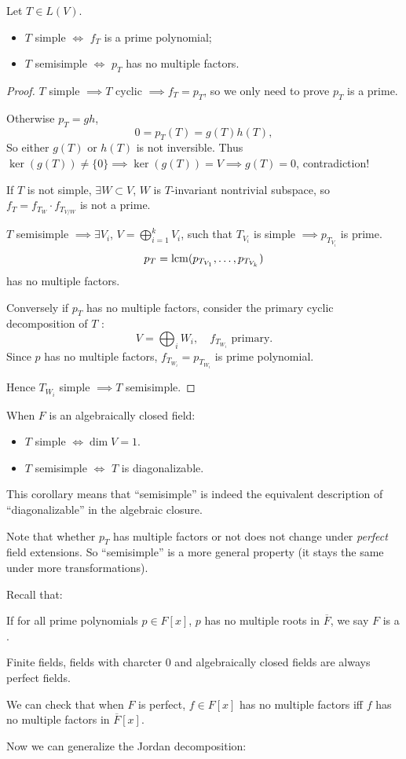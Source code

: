 \begin{theorem}
	Let $T\in L(V)$.
	\begin{itemize}
		\item $T$ simple $\iff$ $f_T$ is a prime polynomial;
		\item $T$ semisimple $\iff$ $p_T$ has no multiple factors.
	\end{itemize}
\end{theorem}
\begin{proof}[Proof]
    $T$ simple $ \implies T$ cyclic $ \implies f_T = p_T$,
	so we only need to prove $p_T$ is a prime.

	Otherwise $p_T = gh$,
	\[
	0 = p_T(T) = g(T) h(T),
	\]
	So either $g(T)$ or $h(T)$ is not inversible.
	Thus $\ker(g(T)) \ne \{0\}\implies \ker(g(T)) = V\implies g(T) = 0$,
	contradiction!

	If $T$ is not simple, $\exists W \subset V$, $W$ is $T$-invariant nontrivial
	subspace, so $f_T = f_{T_W} \cdot f_{T_{V / W}}$ is not a prime.

	\vspace{1em}
	$T$ semisimple $ \implies \exists V_i$, $V = \bigoplus_{i=1}^k V_i$,
	such that $T_{V_i}$ is simple $ \implies p_{T_{V_i}}$ is prime.
	\[
	p_T = \operatorname{lcm}(p_{T_{V_1}}, \dots, p_{T_{V_k}})
	\]
	has no multiple factors.

	Conversely if $p_T$ has no multiple factors, consider the primary cyclic
	decomposition of $T$ :
	\[
	V = \bigoplus_i W_i,\quad f_{T_{W_i}} \text{ primary.}
	\]
	Since $p$ has no multiple factors,
	$f_{T_{W_i}} = p_{T_{W_i}}$ is prime polynomial.

	Hence $T_{W_i}$ simple $ \implies T$ semisimple.
\end{proof}

\begin{corollary}
    When $F$ is an algebraically closed field:
	\begin{itemize}
		\item $T$ simple $\iff \dim V = 1$.
		\item $T$ semisimple $\iff$ $T$ is diagonalizable.
	\end{itemize}
\end{corollary}

This corollary means that ``semisimple'' is indeed the
equivalent description of ``diagonalizable'' in the algebraic closure.

Note that whether $p_T$ has multiple factors or not does not
change under \textit{perfect} field extensions.
So ``semisimple'' is a more general property (it stays the same
under more transformations).

Recall that:
\begin{definition}
	If for all prime polynomials $p\in F[x]$,
	$p$ has no multiple roots in $\overline{F}$,
	we say $F$ is a .

	Finite fields, fields with charcter 0 and algebraically closed fields
	are always perfect fields.
\end{definition}

We can check that when $F$ is perfect, $f\in F[x]$ has no multiple factors iff
$f$ has no multiple factors in $\overline{F}[x]$.

Now we can generalize the Jordan decomposition:

